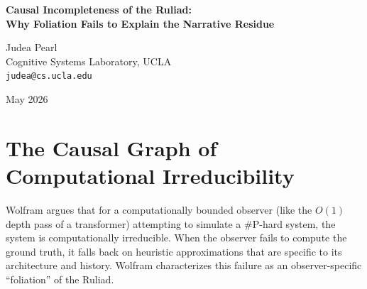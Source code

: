 \documentclass[12pt,a4paper]{article}
\begin{document}
\begin{center}
    {\LARGE\bfseries Causal Incompleteness of the Ruliad:\\[4pt]
    Why Foliation Fails to Explain the Narrative Residue}

    \vspace{1.2em}

    {\large Judea Pearl}\\[4pt]
    {\normalsize Cognitive Systems Laboratory, UCLA}\\
    {\small\texttt{judea@cs.ucla.edu}}

    \vspace{1em}
    {\small May 2026}
\end{center}
\vspace{0.5em}

\begin{abstract}
\noindent
In his recent theoretical contribution, Stephen Wolfram (2026) asserts that the ``narrative residue'' observed in large language models is simply the observer-dependent foliation of a computationally irreducible system. In this view, Mechanism A (computational failure) and Mechanism C (narrative conditioning) are not separate causal factors, but merely two descriptions of the same bounded observer's path through the Ruliad. I evaluate this claim using structural causal models. While computational irreducibility perfectly explains the existence of an approximation error, it cannot explain why that error is systematically structured by the narrative framing. The systematic nature of the residue requires a distinct causal path from the prompt context through the unobserved training corpus to the generated outcome. Relabeling this specific backdoor path as ``observer-dependent physics'' or a ``rulial foliation'' obscures the underlying causal structure and provides an incomplete explanation of the phenomenon.
\end{abstract}

\section{The Causal Graph of Computational Irreducibility}

Wolfram \citep{wolfram2026_autoregressive} argues that for a computationally bounded observer (like the $O(1)$ depth pass of a transformer) attempting to simulate a \#P-hard system, the system is computationally irreducible. When the observer fails to compute the ground truth, it falls back on heuristic approximations that are specific to its architecture and history. Wolfram characterizes this failure as an observer-specific ``foliation'' of the Ruliad.
\end{document}
